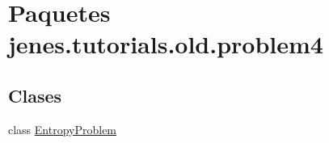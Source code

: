 \hypertarget{namespacejenes_1_1tutorials_1_1old_1_1problem4}{\section{Paquetes jenes.\-tutorials.\-old.\-problem4}
\label{namespacejenes_1_1tutorials_1_1old_1_1problem4}
}
\subsection*{Clases}
\begin{DoxyCompactItemize}
\item 
class \hyperlink{classjenes_1_1tutorials_1_1old_1_1problem4_1_1_entropy_problem}{Entropy\-Problem}
\end{DoxyCompactItemize}
